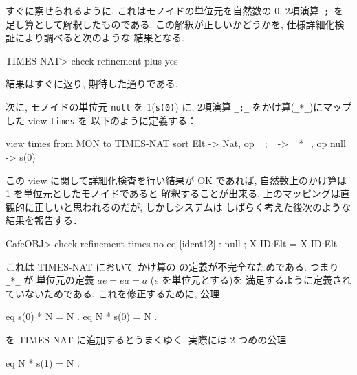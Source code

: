 すぐに察せられるように, これはモノイドの単位元を自然数の 0,
2項演算\texttt{\_;\_}を足し算として解釈したものである. 
この解釈が正しいかどうかを, 仕様詳細化検証により調べると次のような
結果となる.

\begin{vvtm}
\begin{examplev}
TIMES-NAT> check refinement plus
yes
\end{examplev}
\end{vvtm}

結果はすぐに返り, 期待した通りである.

次に, モノイドの単位元 \texttt{null} を 1(\texttt{s(0)}) に,
2項演算 \texttt{\_;\_} をかけ算(\texttt{\_*\_})にマップした 
view \texttt{times} を
以下のように定義する：

\begin{vvtm}
\begin{simplev}
view times from MON to TIMES-NAT {
  sort Elt -> Nat,
  op _;_ -> _*_,
  op null -> s(0)
}
\end{simplev}
\end{vvtm}

この view に関して詳細化検査を行い結果が OK であれば,
自然数上のかけ算は 1 を単位元としたモノイドであると
解釈することが出来る. 
上のマッピングは直観的に正しいと思われるのだが, しかしシステムは
しばらく考えた後次のような結果を報告する．

\begin{vvtm}
\begin{examplev}
CafeOBJ> check refinement times
no
  eq [ident12] : null ; X-ID:Elt = X-ID:Elt
\end{examplev}
\end{vvtm}

これは TIMES-NAT において かけ算の
の定義が不完全なためである. つまり\texttt{\_*\_} が
単位元の定義 $ae=ea=a$ ($e$ を単位元とする)を
満足するように定義されていないためである. 
これを修正するために, 公理

\begin{vvtm}
\begin{simplev}
 eq s(0) * N = N .
 eq N * s(0) = N .
\end{simplev}
\end{vvtm}

を TIMES-NAT に追加するとうまくゆく. 
実際には 2 つめの公理 

\begin{vvtm}
\begin{simplev}
 eq N * s(1) = N .
\end{simplev}
\end{vvtm}

